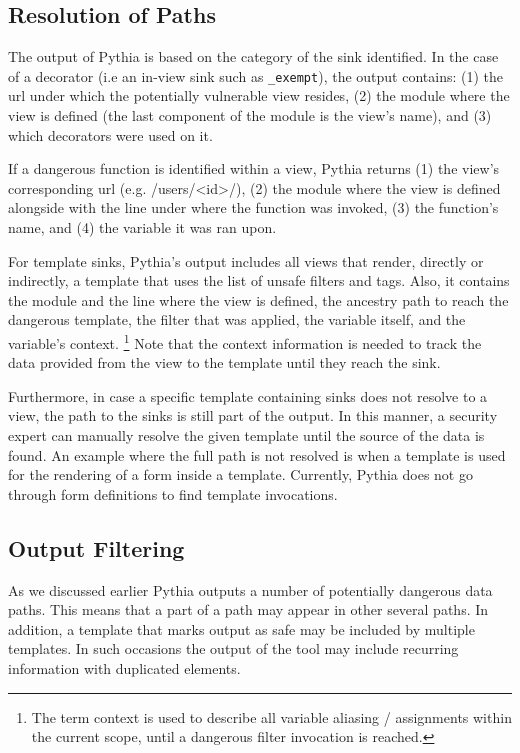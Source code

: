 \subsection{Resolution of Paths}
\label{sec:output}

The output of Pythia is based on the
category of the sink identified.
In the case of a decorator
(i.e an in-view sink such as
{\tt \@csrf\_exempt}),
the output contains:
(1) the {\sc url} under
which the potentially vulnerable
view resides,
(2) the module where the view is defined
(the last component of the module is the view's name), 
and (3) which decorators were used on it.

If a dangerous function is identified within a view,
Pythia returns (1) the view's corresponding
{\sc url} (e.g. /users/<id>/),
(2) the module where the view is defined
alongside with the line under where
the function was invoked,
(3) the function's name,
and (4) the variable it was ran upon.

For template sinks,
Pythia's output includes all views that render,
directly or indirectly,
a template that uses the list of
unsafe filters and tags.
Also,
it contains the module and the line where
the view is defined,
the ancestry path to reach the dangerous template,
the filter that was applied,
the variable itself,
and the variable's context.
\footnote{The term context is used to describe all variable aliasing / assignments
within the current scope, until a dangerous filter invocation is reached.}
Note that the context information is needed
to track the data provided from the view to
the template until they reach the sink.

Furthermore,
in case a specific template containing sinks
does not resolve to a view,
the path to the sinks is still part of the output.
In this manner,
a security expert can manually resolve
the given template until the source
of the data is found.
An example where the full path is not
resolved is when a template is used
for the rendering of a form inside a template.
Currently,
Pythia does not go through form definitions
to find template invocations.

\subsection{Output Filtering}
\label{sec:filtering}

As we discussed earlier Pythia
outputs a number of potentially
dangerous data paths.
This means that a part of a path
may appear in other several paths.
In addition,
a template that marks output
as safe may be included by multiple
templates.
In such occasions the output of
the tool may include recurring information
with duplicated elements.

